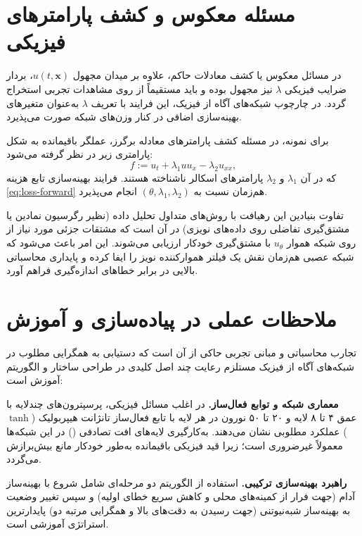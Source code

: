 \section{مسئله معکوس و کشف پارامترهای فیزیکی}
\label{sec:inverse}

در مسائل معکوس یا کشف معادلات حاکم، علاوه بر میدان مجهول $u(t,\mathbf{x})$، بردار ضرایب فیزیکی $\lambda$ نیز مجهول بوده و باید مستقیماً از روی مشاهدات تجربی استخراج گردد. در چارچوب شبکه‌های آگاه از فیزیک، این فرایند با تعریف $\lambda$ به‌عنوان متغیرهای بهینه‌سازی اضافی در کنار وزن‌های شبکه صورت می‌پذیرد.

برای نمونه، در مسئله کشف پارامترهای معادله برگرز، عملگر باقیمانده به شکل پارامتری زیر در نظر گرفته می‌شود:
\begin{equation}
f := u_t + \lambda_1 u u_x - \lambda_2 u_{xx},
\label{eq:burgers-f-inv}
\end{equation}
که در آن $\lambda_1$ و $\lambda_2$ پارامترهای اسکالر ناشناخته هستند. فرایند بهینه‌سازی تابع هزینه \eqref{eq:loss-forward} هم‌زمان نسبت به $(\theta, \lambda_1, \lambda_2)$ انجام می‌پذیرد.

تفاوت بنیادین این رهیافت با روش‌های متداول تحلیل داده (نظیر رگرسیون نمادین یا مشتق‌گیری تفاضلی روی داده‌های نویزی) در آن است که مشتقات جزئی مورد نیاز از روی شبکه هموار $u_\theta$ با مشتق‌گیری خودکار ارزیابی می‌شوند. این امر باعث می‌شود که شبکه عصبی هم‌زمان نقش یک فیلتر هموارکننده نویز را ایفا کرده و پایداری محاسباتی بالایی در برابر خطاهای اندازه‌گیری فراهم آورد.

\section{ملاحظات عملی در پیاده‌سازی و آموزش}
\label{sec:practical}

تجارب محاسباتی و مبانی تجربی حاکی از آن است که دستیابی به همگرایی مطلوب در شبکه‌های آگاه از فیزیک مستلزم رعایت چند اصل کلیدی در طراحی ساختار و الگوریتم آموزش است:

\textbf{معماری شبکه و توابع فعال‌ساز.} در اغلب مسائل فیزیکی، پرسپترون‌های چندلایه با عمق ۴ تا ۸ لایه و ۲۰ تا ۵۰ نورون در هر لایه با تابع فعال‌ساز تانژانت هیپربولیک ($\tanh$) عملکرد مطلوبی نشان می‌دهند. به‌کارگیری لایه‌های افت تصادفی () در این شبکه‌ها معمولاً غیرضروری است؛ زیرا قید فیزیکی باقیمانده به‌طور خودکار مانع بیش‌برازش می‌گردد.

\textbf{راهبرد بهینه‌سازی ترکیبی.} استفاده از الگوریتم دو مرحله‌ای شامل شروع با بهینه‌ساز آدام (جهت فرار از کمینه‌های محلی و کاهش سریع خطای اولیه) و سپس تغییر وضعیت به بهینه‌ساز شبه‌نیوتنی  (جهت رسیدن به دقت‌های بالا و همگرایی مرتبه دو) پایدارترین استراتژی آموزشی است.

